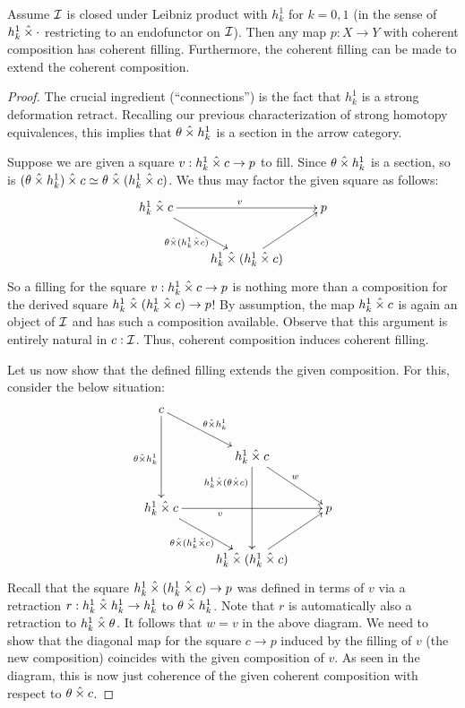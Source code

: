 \documentclass[reqno,10pt,a4paper,oneside]{amsart}
\begin{document}
\begin{lemma}
Assume $\cal{I}$ is closed under Leibniz product with $h_k^1$ for $k = 0, 1$ (in the sense of $h_k^1 \hattimes \arghole$ restricting to an endofunctor on $\cal{I}$).
Then any map $p : X \to Y$ with coherent composition has coherent filling.
Furthermore, the coherent filling can be made to extend the coherent composition.
\end{lemma}

\begin{proof}
The crucial ingredient (``connections'') is the fact that $h_k^1$ is a strong deformation retract.
Recalling our previous characterization of strong homotopy equivalences, this implies that $\theta \hattimes h_k^1$ is a section in the arrow category.

Suppose we are given a square $v : h_k^1 \hattimes c \to p$ to fill.
Since $\theta \hattimes h_k^1$ is a section, so is $(\theta \hattimes h_k^1) \hattimes c \simeq \theta \hattimes (h_k^1 \hattimes c)$.
We thus may factor the given square as follows:
\[
\xymatrix{
  h_k^1 \hattimes c
  \ar[rr]^{v}
  \ar[dr]_{\theta \hattimes (h_k^1 \hattimes c)}
&&
  p
\\&
  h_k^1 \hattimes (h_k^1 \hattimes c)
  \ar[ur]
}
\]
So a filling for the square $v : h_k^1 \hattimes c \to p$ is nothing more than a composition for the derived square $h_k^1 \hattimes (h_k^1 \hattimes c) \to p$!
By assumption, the map $h_k^1 \hattimes c$ is again an object of $\cal{I}$ and has such a composition available.
Observe that this argument is entirely natural in $c : \cal{I}$.
Thus, coherent composition induces coherent filling.

Let us now show that the defined filling extends the given composition.
For this, consider the below situation:
\[
\xymatrix{
  c
  \ar[dr]^{\theta \hattimes h_k^1}
  \ar[dd]_{\theta \hattimes h_k^1}
\\&
  h_k^1 \hattimes c
  \ar[dd]_(0.25){h_k^1 \hattimes (\theta \hattimes c)}
  \ar[dr]^{w}
\\
  h_k^1 \hattimes c
  \ar[rr]_(0.35){v}
  \ar[dr]_{\theta \hattimes (h_k^1 \hattimes c)}
&&
  p
\\&
  h_k^1 \hattimes (h_k^1 \hattimes c)
  \ar[ur]
}
\]
Recall that the square $h_k^1 \hattimes (h_k^1 \hattimes c) \to p$ was defined in terms of $v$ via a retraction $r : h_k^1 \hattimes h_k^1 \to h_k^1$ to $\theta \hattimes h_k^1$.
Note that $r$ is automatically also a retraction to $h_k^1 \hattimes \theta$.
It follows that $w = v$ in the above diagram.
We need to show that the diagonal map for the square $c \to p$ induced by the filling of $v$ (the new composition) coincides with the given composition of $v$.
As seen in the diagram, this is now just coherence of the given coherent composition with respect to $\theta \hattimes c$.
\end{proof}
\end{document}

